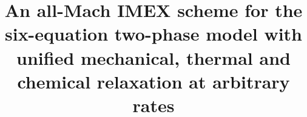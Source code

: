 \documentclass[a4paper,fleqn]{cas-sc}
\begin{document}
\let\WriteBookmarks\relax
\def\floatpagepagefraction{1}
\def\textpagefraction{.001}

\shorttitle{}

\shortauthors{}

\title [mode = title]{An all-Mach IMEX scheme for the six-equation two-phase model with unified mechanical, thermal and chemical relaxation at arbitrary rates}

\tnotemark[1]

\tnotetext[1]{}

%

\author[1]{}%

\cormark[1]

\fnmark[1]

\ead{}

\ead[url]{}

\credit{}


\author[2]{}%

\fnmark[2]

\ead{}

\ead[url]{}

\credit{}


\end{document}
